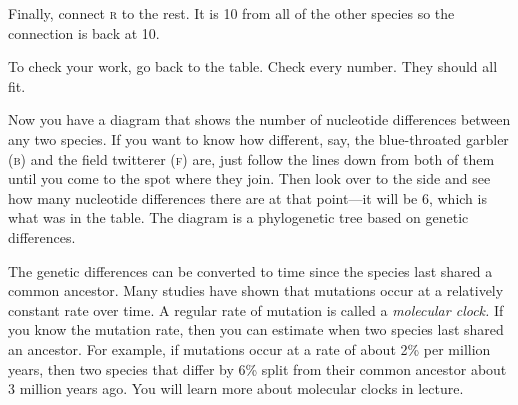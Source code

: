 \documentclass[12pt, addpoints]{exam}
\begin{document}
\begin{questions}
\begin{tikzpicture}[scale=0.8]
\end{tikzpicture}

Finally, connect \textsc{r} to the rest.  It is 10 from all of the other species so the connection is back at 10.


To check your work, go back to the table.  Check every number.  They should all fit.

Now you have a diagram that shows the number of nucleotide differences between any two species.  If you want to know how different, say, the blue-throated garbler (\textsc{b}) and the field twitterer (\textsc{f}) are,  just follow the lines down from both of them until you come to the spot where they join.  Then look over to the side and see how many nucleotide differences there are at that point—it will be 6, which is what was in the table. The diagram is a phylogenetic tree based on genetic differences.  

The genetic differences can be converted to time since the species last shared a common ancestor. Many studies have shown that mutations occur at a relatively constant rate over time. A regular rate of mutation is called a \textit{molecular clock.} If you know the mutation rate, then you can estimate when two species last shared an ancestor. For example, if mutations occur at a rate of about 2\% per million years, then two species that differ by 6\% split from their common ancestor about 3 million years ago. You will learn more about molecular clocks in lecture. 


\end{questions}
\end{document}
